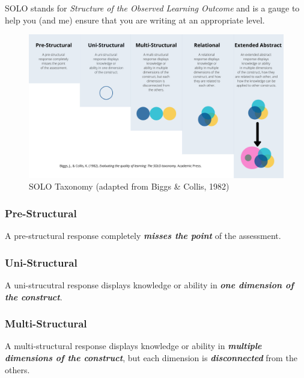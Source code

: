 \documentclass[
]{book}
\begin{document}
SOLO stands for \emph{Structure of the Observed Learning Outcome} and is a gauge to help you (and me) ensure that you are writing at an appropriate level.

\begin{figure}
\centering
\includegraphics{assets/SOLO-taxonomy.png}
\caption{SOLO Taxonomy (adapted from Biggs \& Collis, 1982)}
\end{figure}

\hypertarget{pre-structural}{%
\subsubsection*{Pre-Structural}\label{pre-structural}}

A pre-structural response completely \textbf{\emph{misses the point}} of the assessment.

\hypertarget{uni-structural}{%
\subsubsection*{Uni-Structural}\label{uni-structural}}

A uni-strucutral response displays knowledge or ability in \textbf{\emph{one dimension of the construct}}.

\hypertarget{multi-structural}{%
\subsubsection*{Multi-Structural}\label{multi-structural}}

A multi-structural response displays knowledge or ability in \textbf{\emph{multiple dimensions of the construct}}, but each dimension is \textbf{\emph{disconnected}} from the others.
\end{document}
